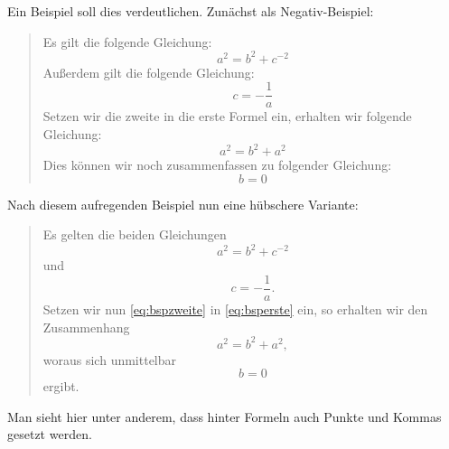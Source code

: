 Ein Beispiel soll dies verdeutlichen. Zunächst als Negativ-Beispiel:
\begin{quote}
	Es gilt die folgende Gleichung:
	\begin{equation}
		a^2=b^2+c^{-2}
	\end{equation}
	Außerdem gilt die folgende Gleichung:
	\begin{equation}
		c=-\frac 1a
	\end{equation}
	Setzen wir die zweite in die erste Formel ein, erhalten wir folgende Gleichung:
	\begin{equation}
		a^2=b^2+a^2
	\end{equation}
	Dies können wir noch zusammenfassen zu folgender Gleichung:
	\begin{equation}
		b=0
	\end{equation}
\end{quote}

Nach diesem aufregenden Beispiel nun eine hübschere Variante:
\begin{quote}
	Es gelten die beiden Gleichungen
	\begin{equation}\label{eq:bsperste}
		a^2=b^2+c^{-2}
	\end{equation}
	und
	\begin{equation}\label{eq:bspzweite}
		c=-\frac 1a.
	\end{equation}
	Setzen wir nun \eqref{eq:bspzweite} in \eqref{eq:bsperste} ein, so erhalten wir den Zusammenhang
	\begin{equation}
		a^2=b^2+a^2,
	\end{equation}
	woraus sich unmittelbar
	\begin{equation}
		b=0
	\end{equation}
	ergibt.
\end{quote}

Man sieht hier unter anderem, dass hinter Formeln auch Punkte und Kommas gesetzt werden.
%
%
